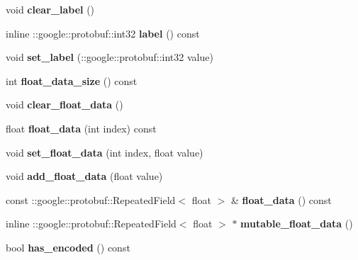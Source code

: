 \begin{DoxyCompactItemize}
void {\bfseries clear\+\_\+label} ()
\item 
\mbox{\label{classcaffe_1_1_datum_a166bf51f0d48326a956462f15aabbf8e}} 
inline \+::google\+::protobuf\+::int32 {\bfseries label} () const
\item 
\mbox{\label{classcaffe_1_1_datum_adba89fb8e6bedf629c910a9bf5ca38f0}} 
void {\bfseries set\+\_\+label} (\+::google\+::protobuf\+::int32 value)
\item 
\mbox{\label{classcaffe_1_1_datum_a992145b0c6b50cb6138ed5f3a30e96cd}} 
int {\bfseries float\+\_\+data\+\_\+size} () const
\item 
\mbox{\label{classcaffe_1_1_datum_a461988d05f145f5000f829f593f34c4e}} 
void {\bfseries clear\+\_\+float\+\_\+data} ()
\item 
\mbox{\label{classcaffe_1_1_datum_a9882968d04bb5ae1776e8276b266ddbb}} 
float {\bfseries float\+\_\+data} (int index) const
\item 
\mbox{\label{classcaffe_1_1_datum_a034af26948237c5f6c29e97a8f04482f}} 
void {\bfseries set\+\_\+float\+\_\+data} (int index, float value)
\item 
\mbox{\label{classcaffe_1_1_datum_a214ae2f07fadaaa8015db8193322a56c}} 
void {\bfseries add\+\_\+float\+\_\+data} (float value)
\item 
\mbox{\label{classcaffe_1_1_datum_a9588ba6cb0c583c1541b043095dc7920}} 
const \+::google\+::protobuf\+::\+Repeated\+Field$<$ float $>$ \& {\bfseries float\+\_\+data} () const
\item 
\mbox{\label{classcaffe_1_1_datum_a98278f2f2836e8de59bda78f3fc59689}} 
inline \+::google\+::protobuf\+::\+Repeated\+Field$<$ float $>$ $\ast$ {\bfseries mutable\+\_\+float\+\_\+data} ()
\item 
\mbox{\label{classcaffe_1_1_datum_aef326ba35a582480897b95539c7501dd}} 
bool {\bfseries has\+\_\+encoded} () const
\item 

\end{DoxyCompactItemize}
